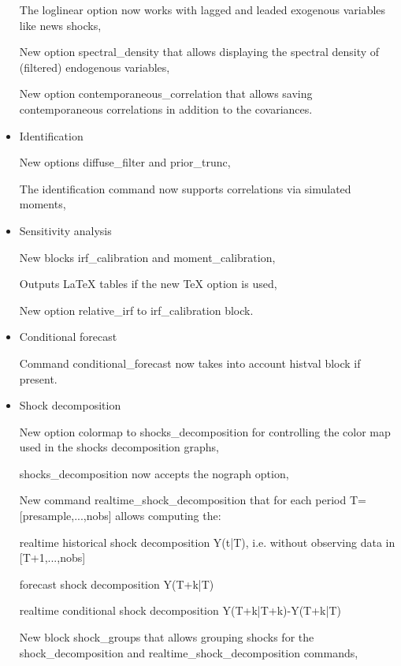 \documentclass[cn,10pt,math=newtx,citestyle=gb7714-2015,bibstyle=gb7714-2015]{elegantbook}
\begin{document}
\begin{itemize}
		
		The loglinear option now works with lagged and leaded exogenous variables like news shocks,
		
		
		New option spectral\_density that allows displaying the spectral density of (filtered) endogenous variables,
		
		
		New option contemporaneous\_correlation that allows saving contemporaneous correlations in addition to the covariances.
		
		
		
		
		\item Identification
		
		
		New options diffuse\_filter and prior\_trunc,
		
		
		The identification command now supports correlations via simulated moments,
		
		
		
		
		\item Sensitivity analysis
		
		
		New blocks irf\_calibration and moment\_calibration,
		
		
		Outputs LaTeX tables if the new TeX option is used,
		
		
		New option relative\_irf to irf\_calibration block.
		
		
		
		
		\item Conditional forecast
		
		Command conditional\_forecast now takes into account histval block if present.
		
		
		
		\item Shock decomposition
		
		
		New option colormap to shocks\_decomposition for controlling the color map used in the shocks decomposition graphs,
		
		
		shocks\_decomposition now accepts the nograph option,
		
		
		New command realtime\_shock\_decomposition that for each period T= [presample,...,nobs] allows computing the:
		
		
		realtime historical shock decomposition Y(t|T), i.e. without observing data in [T+1,...,nobs]
		
		
		forecast shock decomposition Y(T+k|T)
		
		
		realtime conditional shock decomposition Y(T+k|T+k)-Y(T+k|T)
		
		
		
		
		New block shock\_groups that allows grouping shocks for the shock\_decomposition and realtime\_shock\_decomposition commands,
		

\end{itemize}
\end{document}
